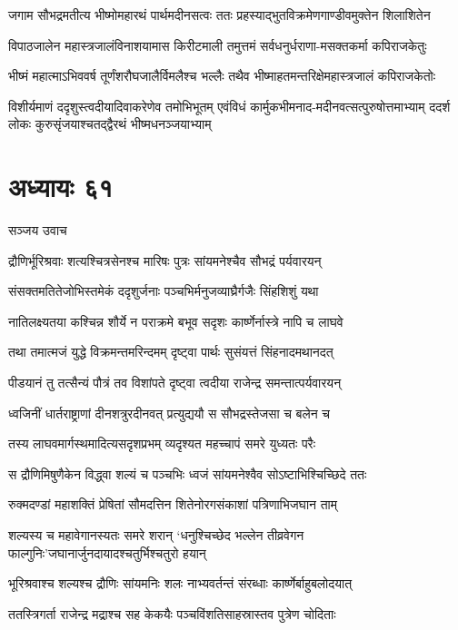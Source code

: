 \twolineshloka
{जगाम सौभद्रमतीत्य भीष्मोमहारथं पार्थमदीनसत्वः}
{ततः प्रहस्याद्भुतविक्रमेणगाण्डीवमुक्तेन शिलाशितेन}


\twolineshloka
{विपाठजालेन महास्त्रजालंविनाशयामास किरीटमाली}
{तमुत्तमं सर्वधनुर्धराणा-मसक्तकर्मा कपिराजकेतुः}


\twolineshloka
{भीष्मं महात्माऽभिववर्ष तूर्णंशरौघजालैर्विमलैश्च भल्लैः}
{तथैव भीष्माहतमन्तरिक्षेमहास्त्रजालं कपिराजकेतोः}


\threelineshloka
{विशीर्यमाणं ददृशुस्त्वदीयादिवाकरेणेव तमोभिभूतम्}
{एवंविधं कार्मुकभीमनाद-मदीनवत्सत्पुरुषोत्तमाभ्याम्}
{ददर्श लोकः कुरुसृंजयाश्चतद्द्वैरथं भीष्मधनञ्जयाभ्याम्}


\chapter{अध्यायः ६१}
\twolineshloka
{सञ्जय उवाच}
{}


\twolineshloka
{द्रौणिर्भूरिश्रवाः शत्यश्चित्रसेनश्च मारिषः}
{पुत्रः सांयमनेश्चैव सौभद्रं पर्यवारयन्}


\twolineshloka
{संसक्तमतितेजोभिस्तमेकं ददृशुर्जनाः}
{पञ्चभिर्मनुजव्याघ्रैर्गजैः सिंहशिशुं यथा}


\twolineshloka
{नातिलक्ष्यतया कश्चिन्न शौर्ये न पराक्रमे}
{बभूव सदृशः कार्ष्णेर्नास्त्रे नापि च लाघवे}


\twolineshloka
{तथा तमात्मजं युद्धे विक्रमन्तमरिन्दमम्}
{दृष्ट्वा पार्थः सुसंयत्तं सिंहनादमथानदत्}


\twolineshloka
{पीडयानं तु तत्सैन्यं पौत्रं तव विशांपते}
{दृष्ट्वा त्वदीया राजेन्द्र समन्तात्पर्यवारयन्}


\twolineshloka
{ध्वजिनीं धार्तराष्ट्राणां दीनशत्रुरदीनवत्}
{प्रत्युद्ययौ स सौभद्रस्तेजसा च बलेन च}


\threelineshloka
{तस्य लाघवमार्गस्थमादित्यसदृशप्रभम्}
{व्यदृश्यत महच्चापं समरे युध्यतः परैः}
{}


\twolineshloka
{स द्रौणिमिषुणैकेन विद्ध्वा शल्यं च पञ्चभिः}
{ध्वजं सांयमनेश्वैव सोऽष्टाभिश्चिच्छिदे ततः}


\twolineshloka
{रुक्मदण्डां महाशक्तिं प्रेषितां सौमदत्तिन}
{शितेनोरगसंकाशां पत्रिणाभिजघान ताम्}


\twolineshloka
{शल्यस्य च महावेगानस्यतः समरे शरान्}
{`धनुश्चिच्छेद भल्लेन तीव्रवेगन फाल्गुनिः'जघानार्जुनदायादश्चतुर्भिश्चतुरो हयान्}


\twolineshloka
{भूरिश्रवाश्च शल्यश्च द्रौणिः सांयमनिः शलः}
{नाभ्यवर्तन्तं संरब्धाः कार्ष्णेर्बाहुबलोदयात्}


\twolineshloka
{ततस्त्रिगर्ता राजेन्द्र मद्राश्च सह केकयैः}
{पञ्चविंशतिसाहस्रास्तव पुत्रेण चोदिताः}


